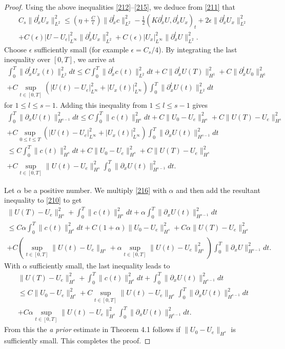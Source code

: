 \documentclass{article}
\theoremstyle{plain}
\begin{document}
\begin{proof}
Using the above inequalities \eqref{212}--\eqref{215}, we deduce from \eqref{211} that
\begin{multline*}
  C_s \|\partial^l_x U_x\|^2_{L^2} \le (\eta+\frac{C}{\epsilon}) \|\partial^l_x c\|_{L^2}^2-\frac{1}{2} (K \partial^l_x U,\partial^l_x U_x)_t  + 2\epsilon \|\partial^l_x U_x\|^2_{L^2} \\
  +C(\epsilon) |U-U_e|_{L^\infty}^2 \|\partial^l_x U_x\|_{L^2}^2 + C(\epsilon) |U_x|_{L^\infty}^2 \|\partial^l_x U\|_{L^2}^2.
\end{multline*}
Choose $\epsilon$ sufficiently small (for example $\epsilon = C_s/4$). By integrating the last inequality over $[0,T]$, we arrive at
\begin{multline*}
  \int_0^T \|\partial^l_x U_x(t)\|^2_{L^2} dt \le C \int_0^T \|\partial^l_x c(t)\|^2_{L^2} dt
  +C\|\partial^l_x U(T)\|_{H^1}^2 + C\|\partial^l_x U_0\|_{H^1}^2 \\
  + C \sup_{t\in [0,T]} (|U(t)-U_e|_{L^\infty}^2 + |U_x(t)|_{L^\infty}^2) \int_0^T \|\partial^l_x U(t)\|_{L^2}^2 dt
\end{multline*}
for $1\le l \le s-1$. Adding this inequality from $1 \le l \le s-1$ gives
\begin{multline}\label{216}
  \int_0^T \|\partial_x U(t)\|^2_{H^{s-1}} dt \le C \int_0^T \|c(t)\|^2_{H^s} dt + C\|U_0-U_e\|^2_{H^s} + C\|U(T)-U_e\|^2_{H^s} \\+C \sup_{0 \le t \le T}(|U(t)-U_e|_{L^\infty}^2 + |U_x(t)|_{L^\infty}^2) \int_0^T \|\partial_x U(t)\|_{H^{s-1}}^2 dt \\
  \le C \int_0^T \|c(t)\|_{H^s}^2 dt + C \|U_0-U_e\|_{H^s}^2 + C\|U(T) -U_e\|_{H^s}^2  \\ + C \sup_{t \in [0,T] }\|U(t)-U_e\|_{H^s}^2 \int_0^T \|\partial_x U(t)\|_{H^{s-1}}^2 dt.
\end{multline}

Let $\alpha$ be a positive number. We multiply \eqref{216} with $\alpha$ and then add the resultant inequality to \eqref{210} to get
\begin{eqnarray*}
  \|U(T)-U_e\|_{H^s}^2 + \int_0^T \|c(t)\|_{H^s}^2 dt + \alpha \int_0^T \|\partial_x U(t)\|_{H^{s-1}}^2 dt \\
  \le C \alpha \int_0^T \|c(t)\|_{H^s}^2 dt +C(1+\alpha)\|U_0 -U_e\|_{H^s}^2 + C \alpha \|U(T)-U_e\|_{H^s}^2  \\ + C(\sup_{t \in [0,T]} \|U(t)-U_e\|_{H^s} + \alpha \sup_{t \in [0,T]} \|U(t)-U_e\|_{H^s}^2)  \int_0^T \|\partial_x U\|_{H^{s-1}}^2 dt.
\end{eqnarray*}
With $\alpha$ sufficiently small, the last inequality leads to
\begin{eqnarray*}
  \|U(T)-U_e\|_{H^s}^2 + \int_0^T \|c(t)\|_{H^s}^2 dt + \int_0^T \|\partial_x U(t)\|_{H^{s-1}}^2 dt \\
  \le C \|U_0-U_e\|_{H^s}^2 + C \sup_{t \in [0,T]} \|U(t)-U_e\|_{H^s} \int_0^T \|\partial_x U(t)\|_{H^{s-1}}^2 dt \\
  +C\alpha  \sup_{t \in [0,T]} \|U(t)-U_e\|_{H^s}^2 \int_0^T \|\partial_x U(t)\|_{H^{s-1}}^2 dt.
\end{eqnarray*}
From this the {\it a prior} estimate in Theorem 4.1 follows if $\|U_0 -U_e\|_{H^s} $ is sufficiently small. This completes the proof.


\end{proof}
\end{document}
